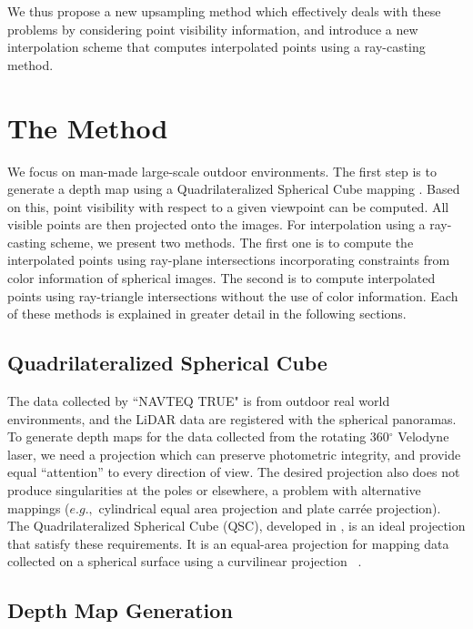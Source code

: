 We thus propose a new upsampling method which effectively deals with these problems by considering point visibility information, and introduce a new interpolation scheme that computes interpolated points using a ray-casting method. 

\section{The Method} 
 
We focus on man-made large-scale outdoor environments. The first step is to generate a depth map using a Quadrilateralized Spherical Cube mapping \cite{ChanNeill75}. Based on this, point visibility with respect to a given viewpoint can be computed. All visible points are then projected onto the images. For interpolation using a ray-casting scheme, we present two methods. The first one is to compute the interpolated points using ray-plane intersections incorporating constraints from color information of spherical images. The second is to compute interpolated points using ray-triangle intersections without the use of color information. Each of these methods is explained in greater detail in the following sections. 

\subsection{Quadrilateralized Spherical Cube}

The data collected by ``NAVTEQ TRUE" is from outdoor real world environments, and the LiDAR data are registered with the spherical panoramas. To generate depth maps for the data collected from the
rotating 360$^\circ$ Velodyne laser, we need a projection which can  preserve photometric integrity, and provide equal “attention” to every direction of view. The desired projection also does not produce singularities at the poles or elsewhere, a problem with alternative mappings ($e.g.,$  cylindrical equal area projection and plate carrée projection). The Quadrilateralized Spherical Cube (QSC), developed in \cite{ChanNeill75}, is an ideal projection that satisfy these requirements. It is an equal-area projection for mapping data collected on a spherical surface using a curvilinear projection ~\cite {qsc-url}. 

\subsection{Depth Map Generation}

